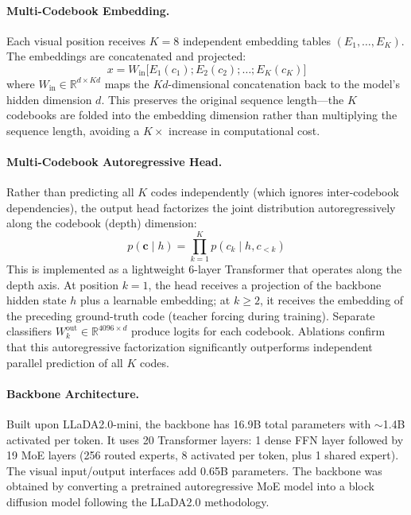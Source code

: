 \documentclass[11pt,a4paper]{article}
\begin{document}
\paragraph{Multi-Codebook Embedding.}
Each visual position receives $K{=}8$ independent embedding tables $(E_1, \ldots, E_K)$. The embeddings are concatenated and projected:
\begin{equation}
x = W_{\text{in}} \bigl[E_1(c_1); E_2(c_2); \ldots; E_K(c_K)\bigr]
\end{equation}
where $W_{\text{in}} \in \mathbb{R}^{d \times Kd}$ maps the $Kd$-dimensional concatenation back to the model's hidden dimension $d$. This preserves the original sequence length---the $K$ codebooks are folded into the embedding dimension rather than multiplying the sequence length, avoiding a $K\times$ increase in computational cost.

\paragraph{Multi-Codebook Autoregressive Head.}
Rather than predicting all $K$ codes independently (which ignores inter-codebook dependencies), the output head factorizes the joint distribution autoregressively along the codebook (depth) dimension:
\begin{equation}
p(\mathbf{c} \mid h) = \prod_{k=1}^{K} p(c_k \mid h, c_{<k})
\end{equation}
This is implemented as a lightweight 6-layer Transformer that operates along the depth axis. At position $k{=}1$, the head receives a projection of the backbone hidden state $h$ plus a learnable embedding; at $k \geq 2$, it receives the embedding of the preceding ground-truth code (teacher forcing during training). Separate classifiers $W_k^{\text{out}} \in \mathbb{R}^{4096 \times d}$ produce logits for each codebook. Ablations confirm that this autoregressive factorization significantly outperforms independent parallel prediction of all $K$ codes.

\paragraph{Backbone Architecture.}
Built upon LLaDA2.0-mini, the backbone has 16.9B total parameters with $\sim$1.4B activated per token. It uses 20 Transformer layers: 1 dense FFN layer followed by 19 MoE layers (256 routed experts, 8 activated per token, plus 1 shared expert). The visual input/output interfaces add 0.65B parameters. The backbone was obtained by converting a pretrained autoregressive MoE model into a block diffusion model following the LLaDA2.0 methodology.
\end{document}
